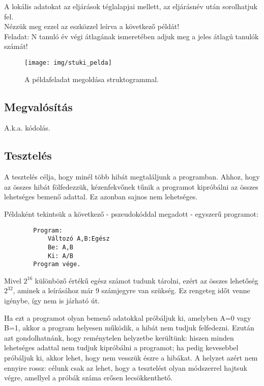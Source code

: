 \documentclass[margin=0px]{article}
\begin{document}
	\noindent A lokális adatokat az eljárások téglalapjai mellett, az eljárásnév után sorolhatjuk fel.\\
	
	\noindent Nézzük meg ezzel az eszközzel leírva a következő példát!\\
	
	\noindent Feladat: N tanuló év végi átlagának ismeretében adjuk meg a jeles átlagú tanulók számát!
	
		\begin{figure}[H]
			\centering
			\texttt{[image: img/stuki\_pelda]}
			\caption{A példafeladat megoldása struktogrammal.}
			\label{fig:stuki_pelda}
		\end{figure}
	
	\subsection{Megvalósítás}
	
		A.k.a. kódolás.
	\subsection{Tesztelés}
		A tesztelés célja, hogy minél több hibát megtaláljunk a programban. Ahhoz, hogy az összes hibát fölfedezzük, kézenfekvőnek tűnik a programot kipróbálni az összes lehetséges bemenő adattal. Ez azonban sajnos nem lehetséges.
		
		\noindent Példaként tekintsük a következő - pszeudokóddal megadott - egyszerű programot:
		
		\begin{verbatim}
		Program:
		    Változó A,B:Egész
		   	Be: A,B
		    Ki: A/B
		Program vége.
		\end{verbatim}
		
	Mivel $2^{16}$ különböző értékű egész számot tudunk tárolni, ezért az összes lehetőség $2^{32}$, aminek a leírásához már 9 számjegyre van szükség. Ez rengeteg időt venne igénybe, így nem is járható út.
	
	Ha ezt a programot olyan bemenő adatokkal próbáljuk ki, amelyben A=0 vagy B=1, akkor a program helyesen működik, a hibát nem tudjuk felfedezni. Ezután azt gondolhatnánk, hogy reménytelen helyzetbe kerültünk: hiszen minden lehetséges adattal nem tudjuk kipróbálni a programot; ha pedig kevesebbel próbáljuk ki, akkor lehet, hogy nem vesszük észre a hibákat. A helyzet azért nem ennyire rossz: célunk csak az lehet, hogy a tesztelést olyan módszerrel hajtsuk végre, amellyel a próbák száma erősen lecsökkenthető.\\
	
\end{document}
